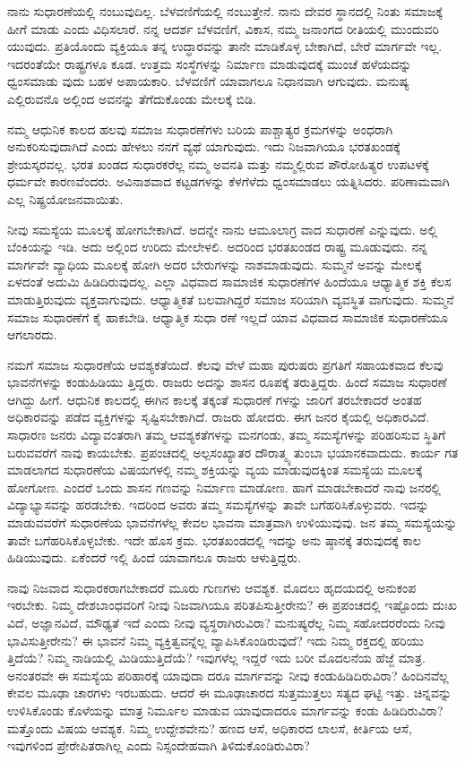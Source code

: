 ನಾನು ಸುಧಾರಣೆಯಲ್ಲಿ ನಂಬುವುದಿಲ್ಲ. ಬೆಳವಣಿಗೆಯಲ್ಲಿ ನಂಬುತ್ತೇನೆ. ನಾನು ದೇವರ ಸ್ಥಾನದಲ್ಲಿ ನಿಂತು ಸಮಾಜಕ್ಕೆ ಹೀಗೆ ಮಾಡು ಎಂದು ವಿಧಿಸಲಾರೆ. ನನ್ನ ಆದರ್ಶ ಬೆಳವಣಿಗೆ, ವಿಕಾಸ, ನಮ್ಮ ಜನಾಂಗದ ರೀತಿಯಲ್ಲಿ ಮುಂದುವರಿ ಯುವುದು. ಪ್ರತಿಯೊಂದು ವ್ಯಕ್ತಿಯೂ ತನ್ನ ಉದ್ಧಾರವನ್ನು ತಾನೇ ಮಾಡಿಕೊಳ್ಳ ಬೇಕಾಗಿದೆ, ಬೇರೆ ಮಾರ್ಗವೇ ಇಲ್ಲ. ಇದರಂತೆಯೇ ರಾಷ್ಟ್ರಗಳೂ ಕೂಡ. ಉತ್ತಮ ಸಂಸ್ಥೆಗಳನ್ನು ನಿರ್ಮಾಣ ಮಾಡುವುದಕ್ಕೆ ಮುಂಚೆ ಹಳೆಯದನ್ನು ಧ್ವಂಸಮಾಡು ವುದು ಬಹಳ ಅಪಾಯಕಾರಿ. ಬೆಳವಣಿಗೆ ಯಾವಾಗಲೂ ನಿಧಾನವಾಗಿ ಆಗುವುದು. ಮನುಷ್ಯ ಎಲ್ಲಿರುವನೊ ಅಲ್ಲಿಂದ ಅವನನ್ನು ತೆಗೆದುಕೊಂಡು ಮೇಲಕ್ಕೆ ಬಿಡಿ.

ನಮ್ಮ ಆಧುನಿಕ ಕಾಲದ ಹಲವು ಸಮಾಜ ಸುಧಾರಣೆಗಳು ಬರಿಯ ಪಾಶ್ಚಾತ್ಯರ ಕ್ರಮಗಳನ್ನು ಅಂಧರಾಗಿ ಅನುಕರಿಸುವುದಾಗಿದೆ ಎಂದು ಹೇಳಲು ನನಗೆ ವ್ಯಥೆ ಯಾಗುವುದು. ಇದು ನಿಜವಾಗಿಯೂ ಭರತಖಂಡಕ್ಕೆ ಶ್ರೇಯಸ್ಕರವಲ್ಲ. ಭರತ ಖಂಡದ ಸುಧಾರಕರೆಲ್ಲ ನಮ್ಮ ಅವನತಿ ಮತ್ತು ನಮ್ಮಲ್ಲಿರುವ ಪೌರೋಹಿತ್ಯರ ಉಪಟಳಕ್ಕೆ ಧರ್ಮವೇ ಕಾರಣವೆಂದರು. ಅವಿನಾಶವಾದ ಕಟ್ಟಡಗಳನ್ನು ಕೆಳಗೆಳೆದು ಧ್ವಂಸಮಾಡಲು ಯತ್ನಿಸಿದರು. ಪರಿಣಾಮವಾಗಿ ಎಲ್ಲ ನಿಷ್ಪ್ರಯೋಜನವಾಯಿತು.

ನೀವು ಸಮಸ್ಯೆಯ ಮೂಲಕ್ಕೆ ಹೋಗಬೇಕಾಗಿದೆ. ಅದನ್ನೇ ನಾನು ಆಮೂಲಾಗ್ರ ವಾದ ಸುಧಾರಣೆ ಎನ್ನುವುದು. ಅಲ್ಲಿ ಬೆಂಕಿಯನ್ನು ಇಡಿ. ಅದು ಅಲ್ಲಿಂದ ಉರಿದು ಮೇಲೇಳಲಿ. ಅದರಿಂದ ಭರತಖಂಡದ ರಾಷ್ಟ್ರ ಮೂಡುವುದು. ನನ್ನ ಮಾರ್ಗವೇ ವ್ಯಾಧಿಯ ಮೂಲಕ್ಕೆ ಹೋಗಿ ಅದರ ಬೇರುಗಳನ್ನು ನಾಶಮಾಡುವುದು. ಸುಮ್ಮನೆ ಅವನ್ನು ಮೇಲಕ್ಕೆ ಏಳದಂತೆ ಅದುಮಿ ಹಿಡಿದಿರುವುದಲ್ಲ. ಎಲ್ಲಾ ವಿಧವಾದ ಸಾಮಾಜಿಕ ಸುಧಾರಣೆಗಳ ಹಿಂದೆಯೂ ಆಧ್ಯಾತ್ಮಿಕ ಶಕ್ತಿ ಕೆಲಸ ಮಾಡುತ್ತಿರುವುದು ವ್ಯಕ್ತವಾಗುವುದು. ಆಧ್ಯಾತ್ಮಿಕತೆ ಬಲವಾಗಿದ್ದರೆ ಸಮಾಜ ಸರಿಯಾಗಿ ವ್ಯವಸ್ಥಿತ ವಾಗುವುದು. ಸುಮ್ಮನೆ ಸಮಾಜ ಸುಧಾರಣೆಗೆ ಕೈ ಹಾಕಬೇಡಿ. ಆಧ್ಯಾತ್ಮಿಕ ಸುಧಾ ರಣೆ ಇಲ್ಲದೆ ಯಾವ ವಿಧವಾದ ಸಾಮಾಜಿಕ ಸುಧಾರಣೆಯೂ ಆಗಲಾರದು.

ನಮಗೆ ಸಮಾಜ ಸುಧಾರಣೆಯ ಆವಶ್ಯಕತೆಯಿದೆ. ಕೆಲವು ವೇಳೆ ಮಹಾ ಪುರುಷರು ಪ್ರಗತಿಗೆ ಸಹಾಯಕವಾದ ಕೆಲವು ಭಾವನೆಗಳನ್ನು ಕಂಡುಹಿಡಿಯು ತ್ತಿದ್ದರು. ರಾಜರು ಅದನ್ನು ಶಾಸನ ರೂಪಕ್ಕೆ ತರುತ್ತಿದ್ದರು. ಹಿಂದೆ ಸಮಾಜ ಸುಧಾರಣೆ ಆಗಿದ್ದು ಹೀಗೆ. ಆಧುನಿಕ ಕಾಲದಲ್ಲಿ ಈಗಿನ ಕಾಲಕ್ಕೆ ತಕ್ಕಂತೆ ಸುಧಾರಣೆ ಗಳನ್ನು ಜಾರಿಗೆ ತರಬೇಕಾದರೆ ಅಂತಹ ಅಧಿಕಾರವನ್ನು ಪಡೆದ ವ್ಯಕ್ತಿಗಳನ್ನು ಸೃಷ್ಟಿಸಬೇಕಾಗಿದೆ. ರಾಜರು ಹೋದರು. ಈಗ ಜನರ ಕೈಯಲ್ಲಿ ಅಧಿಕಾರವಿದೆ. ಸಾಧಾರಣ ಜನರು ವಿದ್ಯಾವಂತರಾಗಿ ತಮ್ಮ ಆವಶ್ಯಕತೆಗಳನ್ನು ಮನಗಂಡು, ತಮ್ಮ ಸಮಸ್ಯೆಗಳನ್ನು ಪರಿಹರಿಸುವ ಸ್ಥಿತಿಗೆ ಬರುವವರೆಗೆ ನಾವು ಕಾಯಬೇಕು. ಪ್ರಪಂಚದಲ್ಲಿ ಅಲ್ಪಸಂಖ್ಯಾತರ ದೌರಾತ್ಮ್ಯ ತುಂಬಾ ಭಯಾನಕವಾದುದು. ಕಾರ್ಯ ಗತ ಮಾಡಲಾಗದ ಸುಧಾರಣೆಯ ವಿಷಯಗಳಲ್ಲಿ ನಮ್ಮ ಶಕ್ತಿಯನ್ನು ವ್ಯಯ ಮಾಡುವುದಕ್ಕಿಂತ ಸಮಸ್ಯೆಯ ಮೂಲಕ್ಕೆ ಹೋಗೋಣ. ಎಂದರೆ ಒಂದು ಶಾಸನ ಗಣವನ್ನು ನಿರ್ಮಾಣ ಮಾಡೋಣ. ಹಾಗೆ ಮಾಡಬೇಕಾದರೆ ನಾವು ಜನರಲ್ಲಿ ವಿದ್ಯಾಭ್ಯಾಸವನ್ನು ಹರಡಬೇಕು. ಇದರಿಂದ ಅವರು ತಮ್ಮ ಸಮಸ್ಯೆಗಳನ್ನು ತಾವೇ ಬಗೆಹರಿಸಿಕೊಳ್ಳುವರು. ಇದನ್ನು ಮಾಡುವವರೆಗೆ ಸುಧಾರಣೆಯ ಭಾವನೆಗಳೆಲ್ಲ ಕೇವಲ ಭಾವನಾ ಮಾತ್ರವಾಗಿ ಉಳಿಯುವುವು. ಜನ ತಮ್ಮ ಸಮಸ್ಯೆಯನ್ನು ತಾವೇ ಬಗೆಹರಿಸಿಕೊಳ್ಳಬೇಕು. ಇದೇ ಹೊಸ ಕ್ರಮ. ಭರತಖಂಡದಲ್ಲಿ ಇದನ್ನು ಅನು ಷ್ಠಾನಕ್ಕೆ ತರುವುದಕ್ಕೆ ಕಾಲ ಹಿಡಿಯುವುದು. ಏಕೆಂದರೆ ಇಲ್ಲಿ ಹಿಂದೆ ಯಾವಾಗಲೂ ರಾಜರು ಆಳುತ್ತಿದ್ದರು.

ನಾವು ನಿಜವಾದ ಸುಧಾರಕರಾಗಬೇಕಾದರೆ ಮೂರು ಗುಣಗಳು ಆವಶ್ಯಕ. ಮೊದಲು ಹೃದಯದಲ್ಲಿ ಅನುಕಂಪ ಇರಬೇಕು. ನಿಮ್ಮ ದೇಶಬಾಂಧವರಿಗೆ ನೀವು ನಿಜವಾಗಿಯೂ ಪರಿತಪಿಸುತ್ತೀರೇನು? ಈ ಪ್ರಪಂಚದಲ್ಲಿ ಇಷ್ಟೊಂದು ದುಃಖ ವಿದೆ, ಅಜ್ಞಾನವಿದೆ, ಮೌಢ್ಯತೆ ಇದೆ ಎಂದು ನೀವು ವ್ಯಸ್ಥರಾಗಿರುವಿರಾ? ಮನುಷ್ಯರೆಲ್ಲ ನಿಮ್ಮ ಸಹೋದರರೆಂದು ನೀವು ಭಾವಿಸುತ್ತೀರೇನು? ಈ ಭಾವನೆ ನಿಮ್ಮ ವ್ಯಕ್ತಿತ್ವವನ್ನೆಲ್ಲ ವ್ಯಾಪಿಸಿಕೊಂಡಿರುವುದೆ? ಇದು ನಿಮ್ಮ ರಕ್ತದಲ್ಲಿ ಹರಿಯು ತ್ತಿದೆಯೆ? ನಿಮ್ಮ ನಾಡಿಯಲ್ಲಿ ಮಿಡಿಯುತ್ತಿದೆಯೆ? ಇವುಗಳೆಲ್ಲ ಇದ್ದರೆ ಇದು ಬರೀ ಮೊದಲನೆಯ ಹೆಜ್ಜೆ ಮಾತ್ರ. ಅನಂತರವೇ ಈ ಸಮಸ್ಯೆಯ ಪರಿಹಾರಕ್ಕೆ ಯಾವುದಾ ದರೂ ಮಾರ್ಗವನ್ನು ನೀವು ಕಂಡುಹಿಡಿದಿರುವಿರಾ? ಹಿಂದಿನವೆಲ್ಲ ಕೇವಲ ಮೂಢಾ ಚಾರಗಳು ಇರಬಹುದು. ಆದರೆ ಈ ಮೂಢಾಚಾರದ ಸುತ್ತಮುತ್ತಲು ಸತ್ಯದ ಘಟ್ಟಿ ಇತ್ತು. ಚಿನ್ನವನ್ನು ಉಳಿಸಿಕೊಂಡು ಕೊಳೆಯನ್ನು ಮಾತ್ರ ನಿರ್ಮೂಲ ಮಾಡುವ ಯಾವುದಾದರೂ ಮಾರ್ಗವನ್ನು ಕಂಡು ಹಿಡಿದಿರುವಿರಾ? ಮತ್ತೊಂದು ವಿಷಯ ಆವಶ್ಯಕ. ನಿಮ್ಮ ಉದ್ದೇಶವೇನು? ಹಣದ ಆಸೆ, ಅಧಿಕಾರದ ಲಾಲಸೆ, ಕೀರ್ತಿಯ ಆಸೆ, ಇವುಗಳಿಂದ ಪ್ರೇರೇಪಿತರಾಗಿಲ್ಲ ಎಂದು ನಿಸ್ಸಂದೇಹವಾಗಿ ತಿಳಿದುಕೊಂಡಿರುವಿರಾ?

